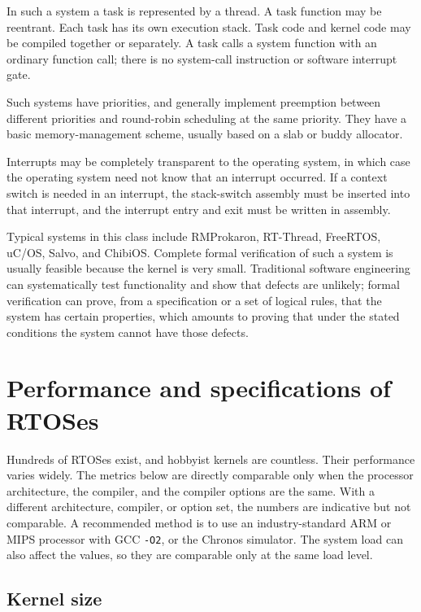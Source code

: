 In such a system a task is represented by a thread.
A task function may be reentrant.
Each task has its own execution stack.
Task code and kernel code may be compiled together or separately.
A task calls a system function with an ordinary function call; there is no system-call instruction or software interrupt gate.

Such systems have priorities, and generally implement preemption between different priorities and round-robin scheduling at the same priority.
They have a basic memory-management scheme, usually based on a slab or buddy allocator.

Interrupts may be completely transparent to the operating system, in which case the operating system need not know that an interrupt occurred.
If a context switch is needed in an interrupt, the stack-switch assembly must be inserted into that interrupt, and the interrupt entry and exit must be written in assembly.

Typical systems in this class include RMProkaron, RT-Thread, FreeRTOS, uC/OS, Salvo, and ChibiOS.
Complete formal verification of such a system is usually feasible because the kernel is very small.
Traditional software engineering can systematically test functionality and show that defects are unlikely; formal verification can prove, from a specification or a set of logical rules, that the system has certain properties, which amounts to proving that under the stated conditions the system cannot have those defects.

\section{Performance and specifications of RTOSes}

Hundreds of RTOSes exist, and hobbyist kernels are countless.
Their performance varies widely.
The metrics below are directly comparable only when the processor architecture, the compiler, and the compiler options are the same.
With a different architecture, compiler, or option set, the numbers are indicative but not comparable.
A recommended method is to use an industry-standard ARM or MIPS processor with GCC \texttt{-O2}, or the Chronos simulator.
The system load can also affect the values, so they are comparable only at the same load level.

\subsection{Kernel size}

